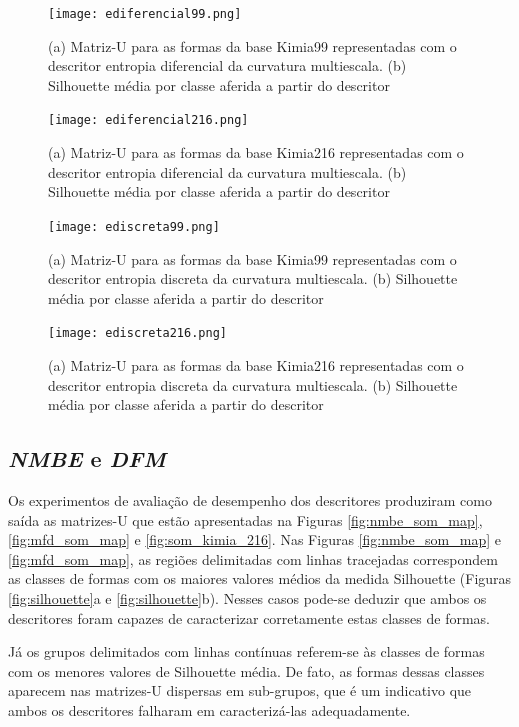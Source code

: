 \begin{figure}
 \caption{\label{fig:edif99} (a) Matriz-U para as formas da base Kimia99 representadas com o descritor entropia diferencial da curvatura multiescala. (b) Silhouette média por classe aferida a partir do descritor}
  \centering
  \texttt{[image: ediferencial99.png]}
\end{figure}

\begin{figure}
 \caption{\label{fig:edif216} (a) Matriz-U para as formas da base Kimia216 representadas com o descritor entropia diferencial da curvatura multiescala. (b) Silhouette média por classe aferida a partir do descritor}
  \centering
  \texttt{[image: ediferencial216.png]}
\end{figure}

\begin{figure}
 \caption{\label{fig:edis99} (a) Matriz-U para as formas da base Kimia99 representadas com o descritor entropia discreta da curvatura multiescala. (b) Silhouette média por classe aferida a partir do descritor}
  \centering
  \texttt{[image: ediscreta99.png]}
\end{figure}

\begin{figure}
 \caption{\label{fig:edis216} (a) Matriz-U para as formas da base Kimia216 representadas com o descritor entropia discreta da curvatura multiescala. (b) Silhouette média por classe aferida a partir do descritor}
  \centering
  \texttt{[image: ediscreta216.png]}
\end{figure}

\subsection{\emph{NMBE} e \emph{DFM}}
Os experimentos de avaliação de desempenho dos descritores produziram como saída as matrizes-U que estão apresentadas na Figuras \ref{fig:nmbe_som_map}, \ref{fig:mfd_som_map} e  \ref{fig:som_kimia_216}. Nas Figuras \ref{fig:nmbe_som_map} e \ref{fig:mfd_som_map}, as regiões delimitadas com linhas tracejadas correspondem as classes de formas com os maiores valores médios da medida Silhouette (Figuras \ref{fig:silhouette}a e \ref{fig:silhouette}b). Nesses casos pode-se deduzir que ambos os descritores foram capazes de caracterizar corretamente estas classes de formas.

Já os grupos delimitados com linhas contínuas referem-se às classes de formas com os menores valores de Silhouette média. De fato, as formas dessas classes aparecem nas matrizes-U dispersas em sub-grupos, que é um indicativo que ambos os descritores falharam em caracterizá-las adequadamente.
  
